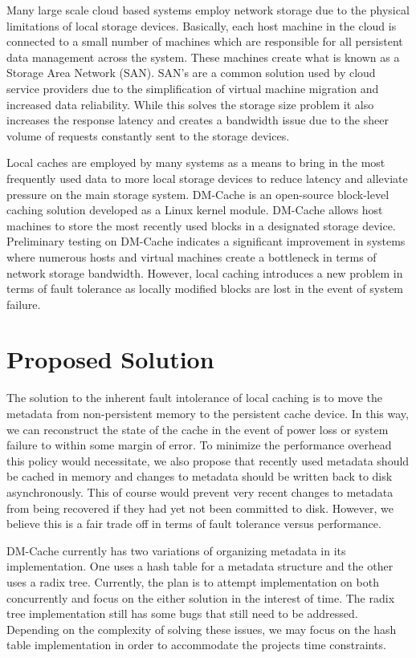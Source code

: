 \documentclass[letterpaper,12pt]{article}
\begin{document}
Many large scale cloud based systems employ network storage due to the
physical limitations of local storage devices. Basically, each host
machine in the cloud is connected to a small number of machines which
are responsible for all persistent data management across the system.
These machines create what is known as a Storage Area Network (SAN).
SAN's are a common solution used by cloud service providers due to the
simplification of virtual machine migration and increased data
reliability\cite{Datacenter}. While this solves the storage size
problem it also increases the response latency and creates a bandwidth
issue due to the sheer volume of requests constantly sent to the
storage devices.

Local caches are employed by many systems as a means to bring in the
most frequently used data to more local storage devices to reduce
latency and alleviate pressure on the main storage system. DM-Cache is
an open-source block-level caching solution developed as a Linux
kernel module. DM-Cache allows host machines to store the most
recently used blocks in a designated storage device. Preliminary
testing on DM-Cache indicates a significant improvement in systems
where numerous hosts and virtual machines create a bottleneck in terms
of network storage bandwidth. However, local caching introduces a new
problem in terms of fault tolerance as locally modified blocks are
lost in the event of system failure.


\section*{Proposed Solution}

The solution to the inherent fault intolerance of local caching is to
move the metadata from non-persistent memory to the persistent cache
device. In this way, we can reconstruct the state of the cache in the
event of power loss or system failure to within some margin of
error. To minimize the performance overhead this policy would
necessitate, we also propose that recently used metadata should be
cached in memory and changes to metadata should be written back to
disk asynchronously. This of course would prevent very recent changes
to metadata from being recovered if they had yet not been committed to
disk. However, we believe this is a fair trade off in terms of fault
tolerance versus performance.

DM-Cache currently has two variations of organizing metadata in its
implementation. One uses a hash table for a metadata structure and the
other uses a radix tree. Currently, the plan is to attempt
implementation on both concurrently and focus on the either solution
in the interest of time. The radix tree implementation still has some
bugs that still need to be addressed. Depending on the complexity of
solving these issues, we may focus on the hash table implementation in
order to accommodate the projects time constraints.
\end{document}

